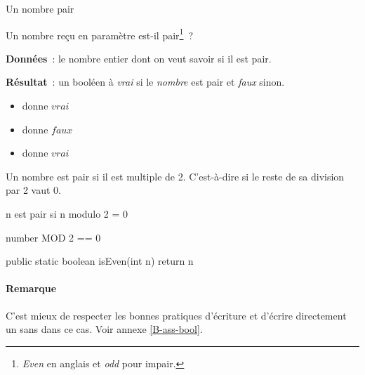 \begin{Fiche}{Un nombre pair}
\label{fiche:calcul-pair}

Un nombre reçu en paramètre est-il pair\footnote{\textit{Even} en anglais et \textit{odd} pour impair.}~?


	\textbf{Données}~: le nombre entier dont on veut savoir si il est pair.
		
	\textbf{Résultat}~: un booléen à \textit{vrai} si le \textit{nombre} est pair et \textit{faux} sinon.

	\begin{center}	
	\end{center}


	\begin{itemize}
	\item {} donne $vrai$
	\item {} donne $faux$
	\item {} donne $vrai$
	\end{itemize}
	

	Un nombre est pair si il est multiple de 2. 
	C’est-à-dire si le reste de sa division par 2 vaut 0.

	\begin{langagenaturel}
		n est pair si n modulo 2 = 0
	\end{langagenaturel}

	\begin{pseudocode}
			\Return number MOD 2 == 0
		\EndAlgo
	\end{pseudocode}

	\begin{java}
public static boolean isEven(int n){
	return n%
}
	\end{java}

	\paragraph{Remarque} C'est mieux de respecter les bonnes pratiques
	d'écriture et d'écrire directement un  sans  dans ce cas.
	Voir annexe \vref{B-ass-bool}.



\end{Fiche}
